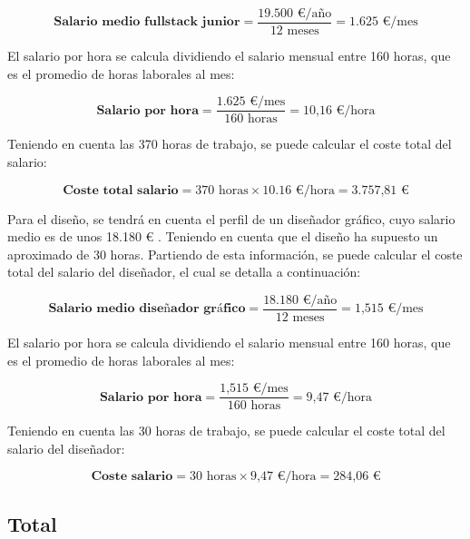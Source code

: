 \begin{equation}
    \textbf{Salario medio fullstack junior} =  \frac {\text{19.500 €/año} }{ \text{12 meses}} = \text{1.625 €/mes}
\end{equation}

El salario por hora se calcula dividiendo el salario mensual entre 160 horas, que es el promedio de horas laborales al mes:

\begin{equation}
    \textbf{Salario por hora} = \frac {\text{1.625 €/mes}}{160 \text{ horas}} = \text{10,16 €/hora}
\end{equation}

Teniendo en cuenta las 370 horas de trabajo, se puede calcular el coste total del salario:

\begin{equation}
    \textbf{Coste total salario} = \text{370 horas} \times \text{10.16 €/hora} = \text{3.757,81 €}
\end{equation}

Para el diseño, se tendrá en cuenta el perfil de un diseñador gráfico, cuyo salario medio es de unos 18.180 € \cite{glassdoor-dis-grafico-2024}. Teniendo en cuenta que el diseño ha supuesto un aproximado de 30 horas. Partiendo de esta información, se puede calcular el coste total del salario del diseñador, el cual se detalla a continuación:

\begin{equation}
    \textbf{Salario medio diseñador gráfico} =  \frac {\text{18.180 €/año} }{ \text{12 meses}} = \text{1,515 €/mes}
\end{equation}

El salario por hora se calcula dividiendo el salario mensual entre 160 horas, que es el promedio de horas laborales al mes:

\begin{equation}
    \textbf{Salario por hora} = \frac {\text{1,515 €/mes}}{160 \text{ horas}} = \text{9,47 €/hora}
\end{equation}

Teniendo en cuenta las 30 horas de trabajo, se puede calcular el coste total del salario del diseñador:

\begin{equation}
    \textbf{Coste salario} = \text{30 horas} \times \text{9,47 €/hora} = \text{284,06 €}
\end{equation}

\subsection*{Total}

